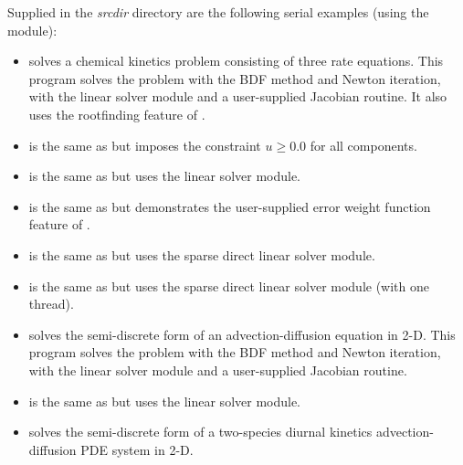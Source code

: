 
\vspace{0.2in}\noindent
Supplied in the {\em srcdir} directory are the
following serial examples (using the {\nvecs} module):

\begin{itemize}


\item {}
  solves a chemical kinetics problem consisting of three rate equations.
  \newline
  This program solves the problem with the BDF method and Newton          
  iteration, with the {\sunlinsoldense} linear solver module and a user-supplied    
  Jacobian routine.  It also uses the rootfinding feature of {\cvodes}.
\item {}
  is the same as  but imposes the constraint
  $u \geq 0.0$ for all components.
\item {}
  is the same as  but uses the
  {\sunlinsollapdense} linear solver module.
\item {}
  is the same as  but demonstrates the user-supplied error
  weight function feature of {\cvodes}.
\item {}
  is the same as  but uses the {\sunlinsolklu}
  sparse direct linear solver module.
\item {}
  is the same as  but uses the
  {\sunlinsolslumt} sparse direct linear solver module (with one thread).
\item {}
  solves the semi-discrete form of an advection-diffusion equation in 2-D. 
  \newline
  This program solves the problem with the BDF method and Newton          
  iteration, with the {\sunlinsolband} linear solver module and a user-supplied     
  Jacobian routine.
\item {}
  is the same as  but uses the {\sunlinsollapband}
  linear solver module.
\item {}
  solves the semi-discrete form of a two-species diurnal kinetics
  advection-diffusion PDE system in 2-D.
  \newline

\end{itemize}
